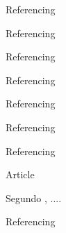 \begin{alineas}
  \item Referencing 
  \item Referencing 
  \item Referencing 
  \item Referencing 
  \item Referencing 
  \item Referencing 
  \item Referencing 
  \item Article \cite{braida2015transforming}
  \item Segundo , ....
  \item Referencing   
\end{alineas}